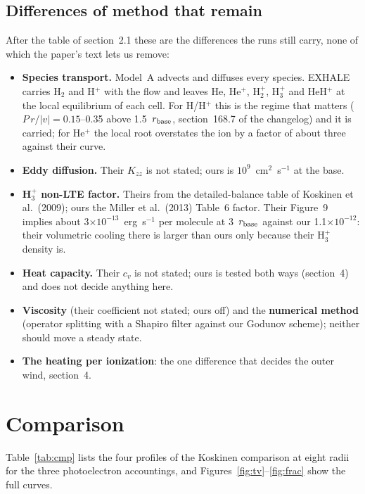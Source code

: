 \documentclass[english,a4paper]{my_memo}
\begin{document}
\subsection{Differences of method that remain}

After the table of section~2.1 these are the differences the runs still
carry, none of which the paper's text lets us remove:
\begin{itemize}
\item \textbf{Species transport.} Model~A advects and diffuses every
  species. EXHALE carries H$_2$ and H$^+$ with the flow and leaves He,
  He$^+$, H$_2^+$, H$_3^+$ and HeH$^+$ at the local equilibrium of each
  cell. For H/H$^+$ this is the regime that matters
  ($P\,r/|v| = 0.15$--0.35 above 1.5~$r_{\rm base}$, section~168.7 of the
  changelog) and it is carried; for He$^+$ the local root overstates the
  ion by a factor of about three against their curve.
\item \textbf{Eddy diffusion.} Their $K_{zz}$ is not stated; ours is
  $10^9$~cm$^2$~s$^{-1}$ at the base.
\item \textbf{H$_3^+$ non-LTE factor.} Theirs from the detailed-balance
  table of Koskinen et al.\ (2009); ours the Miller et al.\ (2013) Table~6
  factor. Their Figure~9 implies about 3$\times10^{-13}$~erg~s$^{-1}$ per
  molecule at 3~$r_{\rm base}$ against our 1.1$\times10^{-12}$: their
  volumetric cooling there is larger than ours only because their H$_3^+$
  density is.
\item \textbf{Heat capacity.} Their $c_v$ is not stated; ours is tested
  both ways (section~4) and does not decide anything here.
\item \textbf{Viscosity} (their coefficient not stated; ours off) and the
  \textbf{numerical method} (operator splitting with a Shapiro filter
  against our Godunov scheme); neither should move a steady state.
\item \textbf{The heating per ionization}: the one difference that
  decides the outer wind, section~4.
\end{itemize}

\section{Comparison}

Table~\ref{tab:cmp} lists the four profiles of the Koskinen comparison at
eight radii for the three photoelectron accountings, and
Figures~\ref{fig:tv}--\ref{fig:frac} show the full curves.
\end{document}
